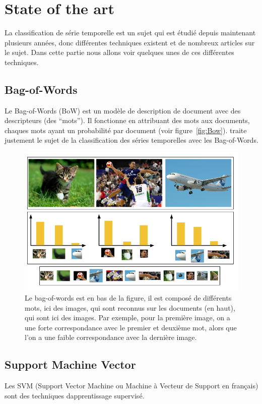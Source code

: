 \documentclass[11pt]{sdm}
\begin{document}
\section{State of the art}
	La classification de s\'erie temporelle est un sujet qui est \'etudi\'e depuis maintenant plusieurs ann\'ees, donc diff\'erentes techniques existent et de nombreux articles sur le sujet. Dans cette partie nous allons voir quelques unes de ces diff\'erentes techniques.
	\subsection{Bag-of-Words}	
		Le Bag-of-Words (BoW) est un mod\`ele de description de document avec des descripteurs (des “mots”). Il fonctionne en attribuant des mots aux documents, chaques mots ayant un probabilit\'e par document (voir figure~\ref{fig:Bow}). \cite{bailly2015bag} traite justement le sujet de la classification des s\'eries temporelles avec les Bag-of-Words.

		\begin{figure}[!ht]
			\centering
			\includegraphics[scale=0.6,natwidth=680,natheight=440]{figures/bagOfWords.png}
			\caption{Le bag-of-words est en bas de la figure, il est compos\'e de diff\'erents mots, ici des images, qui sont reconnus sur les documents (en haut), qui sont ici des images. Par exemple, pour la premi\`ere image, on a une forte correspondance avec le premier et deuxi\`eme mot, alors que l’on a une faible correspondance avec la derni\`ere image.}
			\label{fig:BoW}
		\end{figure}

	\subsection{Support Machine Vector}
		Les SVM (Support Vector Machine ou Machine \`a Vecteur de Support en fran\c cais) sont des techniques d\textquotesingle apprentissage supervis\'e. 
\end{document}
